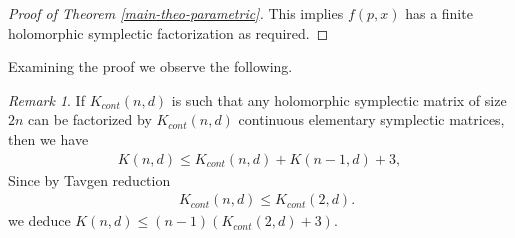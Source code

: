 \documentclass[10pt]{amsart}
\theoremstyle{remark}
\newtheorem{rema}[theo]{Remark}
\begin{document}
\begin{proof}[Proof of Theorem \ref{main-theo-parametric}]
This implies $f(p, x)$ has a finite holomorphic symplectic factorization as required. 
\end{proof}
Examining the proof we observe the following.
\begin{rema}
  If $K_{cont}(n,d)$ is such that any holomorphic 
  symplectic matrix of size $2n$ can be factorized by $K_{cont}(n,d)$ continuous elementary symplectic matrices, then we have
  \begin{align}
      K(n,d) \le K_{cont}(n,d) + K(n-1,d) + 3,
    \end{align}   
   Since by Tavgen reduction \cite{HKS}
   \begin{align}
   \quad K_{cont} (n,d) \le K_{cont}(2,d). 
\end{align}
  we deduce $K(n,d) \le (n-1) (K_{cont}(2,d) + 3)$.
\end{rema}
\end{document}
